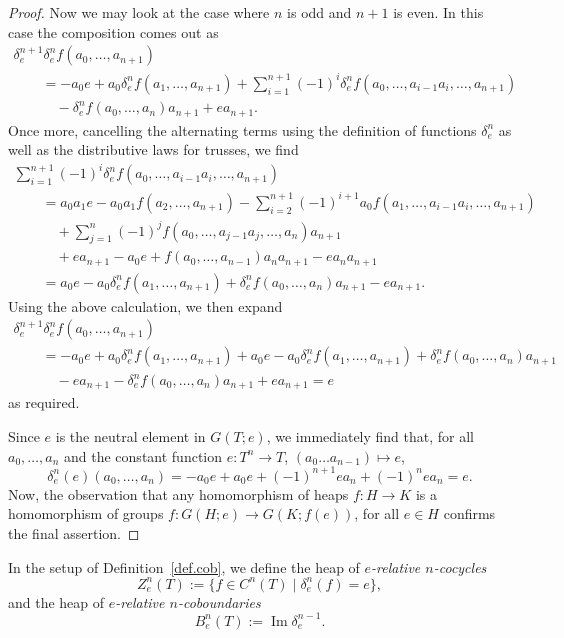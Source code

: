 \documentclass[pdftex]{sigma}
\numberwithin{equation}{section}
\newcommand{\im}{\operatorname{Im}}
\begin{document}
\begin{proof}
 Now we may look at the case where $n$ is odd and $n+1$ is even.
In this case the composition comes out as
\begin{gather*}
 \delta^{n+1}_e\delta^{n}_e f(a_0,\dots,a_{n+1})\\
 \qquad{} = - a_0 e + a_0 \delta^n_e f (a_1,\dots,a_{n+1})  + \sum_{i=1}^{n+1} (-1)^i \delta^n_e f (a_0,\dots,a_{i-1}a_i,\dots,a_{n+1}) \\
\qquad\quad{} - \delta^n_e f(a_0,\dots,a_n)a_{n+1} + ea_{n+1}.
 \end{gather*}
Once more, cancelling the alternating terms using the definition of functions $\delta^n_e$ as well as the distributive laws for trusses, we find
\begin{gather*}
  \sum_{i=1}^{n+1} (-1)^i \delta^n_e f (a_0,\dots,a_{i-1}a_i,\dots,a_{n+1}) \\
  \qquad{}= a_0 a_1 e - a_0 a_1 f(a_2,\dots,a_{n+1})
 - \sum_{i=2}^{n+1}(-1)^{i+1}a_0 f(a_1,\dots,a_{i-1}a_i,\dots,a_{n+1}) \\
\qquad\quad{} + \sum_{j=1}^n (-1)^j f(a_0,\dots,a_{j-1}a_j,\dots,a_n)a_{n+1} \\
 \qquad\quad{} + e a_{n+1} -a_0 e
 + f (a_0,\dots,a_{n-1})a_n a_{n+1} -  ea_n a_{n+1} \\
\qquad{} = a_0e - a_0\delta^n_e f (a_1,\dots,a_{n+1})+ \delta^n_e f (a_0,\dots,a_{n})a_{n+1} - ea_{n+1}.
\end{gather*}
Using the above calculation, we then expand
\begin{gather*}
\delta^{n+1}_e \delta^{n}_e f(a_0,\dots,a_{n+1})\\
\qquad{}  =
- a_0 e + a_0 \delta^n_e f (a_1,\dots,a_{n+1}) + a_0e - a_0\delta^n_e f (a_1,\dots,a_{n+1})+ \delta^n_e f (a_0,\dots,a_{n})a_{n+1}\\
\qquad\quad{}- ea_{n+1}  - \delta^n_e f(a_0,\dots,a_n)a_{n+1} + ea_{n+1} = e
\end{gather*}
as required.

Since $e$ is the neutral element in $G(T;e)$, we immediately find that, for all $a_0,\dots, a_n$ and the constant function $e\colon T^n\to T$, $(a_0\dots a_{n-1})\mapsto e$,
\[
\delta_e^n(e)(a_0,\dots, a_n) = -a_0e +a_0e +(-1)^{n+1}ea_n + (-1)^n ea_n = e.
\]
Now, the observation that any homomorphism of heaps $f\colon H\to K$ is a homomorphism of groups $f\colon G(H;e)\to G(K;f(e))$, for all $e\in H$ confirms the final assertion.
\end{proof}



\begin{Definition}\label{def.cob.coc}
 In the setup of Definition~\ref{def.cob}, we define the heap of {\em $e$-relative $n$-cocycles}
 \[
 Z^n_e(T) := \{f\in C^{n}(T)\; |\; \delta_e^n(f) =e\},
 \]
 and the heap of {\em $e$-relative $n$-coboundaries}
 \[
 B^n_e(T):= \im \delta_e^{n-1}.
 \]
\end{Definition}
\end{document}
